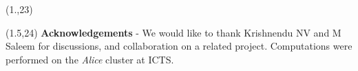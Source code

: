 \documentclass[a1,portrait]{a1poster}
\begin{document}
\begin{textblock}{18}(1.,23)   
\end{textblock}

\begin{textblock}{14}(1.5,24)
\small{\textbf{Acknowledgements} - We would like to thank Krishnendu NV and M Saleem for discussions, and collaboration on a related project. Computations were performed on the \textit{Alice} cluster at ICTS.}

\end{textblock}
\end{document}
